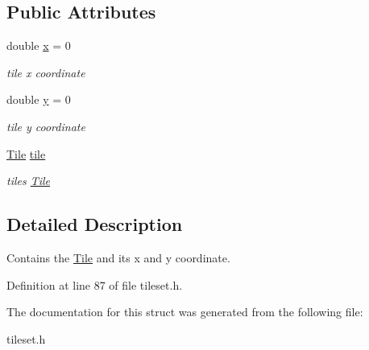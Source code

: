 \subsection*{Public Attributes}
\begin{DoxyCompactItemize}
\item 
double \hyperlink{structTileset_1_1tile_a1ef99a135c4524cdb6074f4f465e11fb}{x} = 0\hypertarget{structTileset_1_1tile_a1ef99a135c4524cdb6074f4f465e11fb}{}\label{structTileset_1_1tile_a1ef99a135c4524cdb6074f4f465e11fb}

\begin{DoxyCompactList}\small\item\em tile x coordinate \end{DoxyCompactList}\item 
double \hyperlink{structTileset_1_1tile_af375f25f2d48ed50fc5ce94f382d0f1e}{y} = 0\hypertarget{structTileset_1_1tile_af375f25f2d48ed50fc5ce94f382d0f1e}{}\label{structTileset_1_1tile_af375f25f2d48ed50fc5ce94f382d0f1e}

\begin{DoxyCompactList}\small\item\em tile y coordinate \end{DoxyCompactList}\item 
\hyperlink{classTile}{Tile} \hyperlink{structTileset_1_1tile_a31c903cd12d0f061e2e0c7b8c3577153}{tile}\hypertarget{structTileset_1_1tile_a31c903cd12d0f061e2e0c7b8c3577153}{}\label{structTileset_1_1tile_a31c903cd12d0f061e2e0c7b8c3577153}

\begin{DoxyCompactList}\small\item\em tile\textquotesingle{}s \hyperlink{classTile}{Tile} \end{DoxyCompactList}\end{DoxyCompactItemize}


\subsection{Detailed Description}
Contains the \hyperlink{classTile}{Tile} and its x and y coordinate. 

Definition at line 87 of file tileset.\+h.



The documentation for this struct was generated from the following file\+:\begin{DoxyCompactItemize}
\item 
tileset.\+h\end{DoxyCompactItemize}
